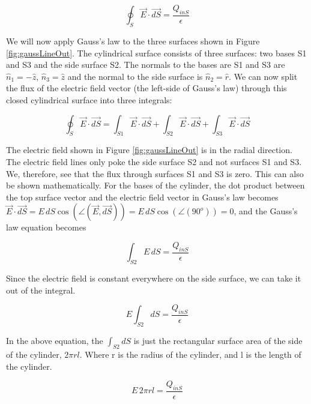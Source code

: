 \documentclass{ximera}
\begin{document}
\begin{equation}
\oint_S \vec{E} \cdot \vec{dS} = \frac{Q_{inS}}{\epsilon}
\end{equation}


We will now apply Gauss's law to the three surfaces shown in Figure  \ref{fig:gaussLineOut}. The cylindrical surface consists of three surfaces: two bases S1 and S3 and the side surface S2. The normals to the bases are S1 and S3 are $\hat{n}_1=-\hat{z}$, $\hat{n}_3=\hat{z}$ and the normal to the side surface is  $\hat{n}_2=\hat{r}$. We can now split the flux of the electric field vector (the left-side of Gauss's law) through this closed cylindrical surface into three integrals:


 
\begin{equation}
\oint_S \vec{E} \cdot \vec{dS} = \int_{S1}  \vec{E} \cdot \vec{dS} +\int_{S2}  \vec{E} \cdot \vec{dS}+\int_{S3}  \vec{E} \cdot \vec{dS}
\end{equation}
 
 The electric field shown in Figure \ref{fig:gaussLineOut} is in the radial direction. The electric field lines only poke the side surface S2 and not surfaces S1 and S3. We, therefore, see that the flux through surfaces S1 and S3 is zero. This can also be shown mathematically. For the bases of the cylinder, the dot product between the top surface vector and the electric field vector in Gauss's law becomes $\vec{E} \cdot \vec{dS}= E \,dS  \cos(\angle(\vec{E},\vec{dS}))= E \,dS  \cos(\angle(90^o)) = 0$, and the Gauss's law equation becomes 

\begin{equation}
\int_{S2} E \,dS  = \frac{Q_{inS}}{\epsilon}
\end{equation}

Since the electric field is constant everywhere on the side surface, we can take it out of the integral. 


\begin{equation}
 E \int_{S2} dS = \frac{Q_{inS}}{\epsilon}
\end{equation}

In the above equation, the $\int_{S2} dS $ is just the rectangular surface area of the side of the cylinder, $2 \pi r l$. Where r is the radius of the cylinder, and l is the length of the cylinder.



\begin{equation}
 E \, 2 \pi r l = \frac{Q_{inS}}{\epsilon}
\end{equation}
\end{document}
